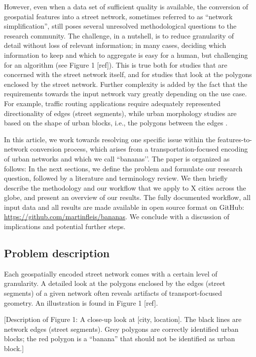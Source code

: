 However, even when a data set of sufficient quality is available, the conversion of geospatial features into a street network, sometimes referred to as ``network simplification'', still poses several unresolved methodological questions to the research community. The challenge, in a nutshell, is to reduce granularity of detail without loss of relevant information; in many cases, deciding which information to keep and which to aggregate is easy for a human, but challenging for an algorithm (see Figure 1 [ref]). This is true both for studies that are concerned with the street network itself, and for studies that look at the polygons enclosed by the street network. Further complexity is added by the fact that the requirements towards the input network vary greatly depending on the use case. For example, traffic routing applications require adequately represented directionality of edges (street segments), while urban morphology studies are based on the shape of urban blocks, i.e., the polygons between the edges \cite{dibble_origin_2019}. 
    
In this article, we work towards resolving one specific issue within the features-to-network conversion process, which arises from a transportation-focused encoding of urban networks and which we call ``bananas’’. The paper is organized as follows: In the next sections, we define the problem and formulate our research question, followed by a literature and terminology review. We then briefly describe the methodology and our workflow that we apply to X cities across the globe, and present an overview of our results. The fully documented workflow, all input data and all results are made available in open source format on GitHub: \url{https://github.com/martinfleis/bananas}. We conclude with a discussion of implications and potential further steps. 

\subsection*{Problem description}
Each geospatially encoded street network comes with a certain level of granularity. A detailed look at the polygons enclosed by the edges (street segments) of a given network often reveals artifacts of transport-focused geometry. An illustration is found in Figure 1 [ref]. 
    
[Description of Figure 1: A close-up look at [city, location]. The black lines are network edges (street segments). Grey polygons are correctly identified urban blocks; the red polygon is a ``banana'' that should not be identified as urban block.]

